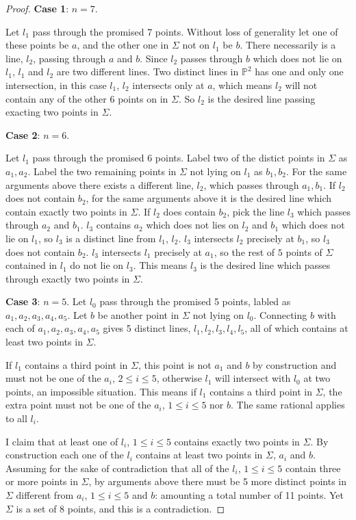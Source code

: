 \documentclass{article}
\theoremstyle{definition}
\theoremstyle{definition}
\theoremstyle{remark}
\newcommand{\bb}[1]{\mathbb{#1}} %
\begin{document}
\begin{proof}
	\textbf{Case 1}: $n = 7$.

	Let $l_1$ pass through the promised 7 points. 
	Without loss of generality let one of these points be $a$, and the other one in $\Sigma$ not on $l_1$ be $b$. 
	There necessarily is a line, $l_2$, passing through $a$ and $b$. 
	Since $l_2$ passes through $b$ which does not lie on $l_1$, $l_1$ and $l_2$ are two different lines.
	Two distinct lines in $\bb{P}^2$ has one and only one intersection, in this case $l_1$, $l_2$ intersects only at $a$, which means $l_2$ will not contain any of the other 6 points on in $\Sigma$. 
	So $l_2$ is the desired line passing exacting two points in $\Sigma$.

	\textbf{Case 2}: $n = 6$.

	Let $l_1$ pass through the promised 6 points. 
	Label two of the distict points in $\Sigma$ as $a_1, a_2$. 
	Label the two remaining points in $\Sigma$ not lying on $l_1$ as $b_1, b_2$.
	For the same arguments above there exists a different line, $l_2$, which passes through $a_1, b_1$. 
	If $l_2$ does not contain $b_2$, for the same arguments above it is the desired line which contain exactly two points in $\Sigma$. 
	If $l_2$ does contain $b_2$, pick the line $l_3$ which passes through $a_2$ and $b_1$. 
	$l_3$ contains $a_2$ which does not lies on $l_2$ and $b_1$ which does not lie on $l_1$, so $l_3$ is a distinct line from $l_1$, $l_2$. 
	$l_3$ intersects $l_2$ precisely at $b_1$, so $l_3$ does not contain $b_2$. 
	$l_3$ intersects $l_1$ precisely at $a_1$, so the rest of $5$ points of $\Sigma$ contained in $l_1$ do not lie on $l_3$. 
	This means $l_3$ is the desired line which passes through exactly two points in $\Sigma$.

	\textbf{Case 3}: $n = 5$.
	Let $l_0$ pass through the promised 5 points, labled as $a_1, a_2, a_3, a_4, a_5$.
	Let $b$ be another point in $\Sigma$ not lying on $l_0$.
	Connecting $b$ with each of $a_1, a_2, a_3, a_4, a_5$ gives 5 distinct lines, $l_1, l_2, l_3, l_4, l_5$, all of which contains at least two points in $\Sigma$. 

	If $l_1$ contains a third point in $\Sigma$, this point is not $a_1$ and $b$ by construction and must not be one of the $a_i$, $2 \leq i \leq 5$, otherwise $l_1$ will intersect with $l_0$ at two points, an impossible situation. This means if $l_1$ contains a third point in $\Sigma$, the extra point must not be one of the $a_i$, $1 \leq i \leq 5$ nor $b$.
	The same rational applies to all $l_i$.

	I claim that at least one of $l_i$, $1 \leq i \leq 5$ contains exactly two points in $\Sigma$. 
	By construction each one of the $l_i$ contains at least two points in $\Sigma$, $a_i$ and $b$.
	Assuming for the sake of contradiction that all of the $l_i$, $1 \leq i \leq 5$ contain three or more points in $\Sigma$, by arguments above there must be 5 more distinct points in $\Sigma$ different from $a_i$, $1 \leq i \leq 5$ and $b$: amounting a total number of 11 points.
	Yet $\Sigma$ is a set of $8$ points, and this is a contradiction.

\end{proof}
\end{document}
